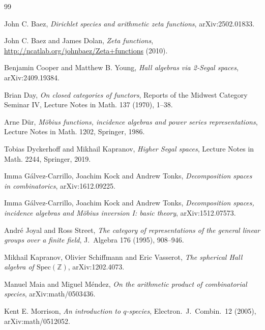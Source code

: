 \documentclass[11pt,a4paper]{article}
\theoremstyle{definition}
\theoremstyle{remark}
\begin{document}
\begin{thebibliography}{99}

 John C. Baez, \emph{Dirichlet species and arithmetic zeta functions},
arXiv:2502.01833.

 John C. Baez and James Dolan, \emph{Zeta functions},
\url{http://ncatlab.org/johnbaez/Zeta+functions} (2010).

 Benjamin Cooper and Matthew B. Young, \emph{Hall algebras via
2-Segal spaces}, arXiv:2409.19384.

 Brian Day, \emph{On closed categories of functors}, Reports of the Midwest
Category Seminar IV, Lecture Notes in Math. 137 (1970), 1--38.

 Arne D\"ur, \emph{M\"obius functions, incidence algebras and power series
representations}, Lecture Notes in Math. 1202, Springer, 1986.

 Tobias Dyckerhoff and Mikhail Kapranov, \emph{Higher Segal
spaces}, Lecture Notes in Math. 2244, Springer, 2019.

 Imma G\'alvez-Carrillo, Joachim Kock and Andrew Tonks,
\emph{Decomposition spaces in combinatorics}, arXiv:1612.09225.

 Imma G\'alvez-Carrillo, Joachim Kock and Andrew Tonks, \emph{Decomposition
spaces, incidence algebras and M\"obius inversion I: basic theory}, arXiv:1512.07573.

 Andr\'e Joyal and Ross Street, \emph{The category of representations
of the general linear groups over a finite field}, J.\ Algebra 176 (1995), 908--946.

 Mikhail Kapranov, Olivier Schiffmann and Eric Vasserot, \emph{The spherical
Hall algebra of $\mathrm{Spec}(\mathbb{Z})$}, arXiv:1202.4073.

 Manuel Maia and Miguel M\'endez, \emph{On the arithmetic product of
combinatorial species}, arXiv:math/0503436.

 Kent E. Morrison, \emph{An introduction to $q$-species}, Electron.\ J.\
Combin.\ 12 (2005), arXiv:math/0512052.

\end{thebibliography}
\end{document}
